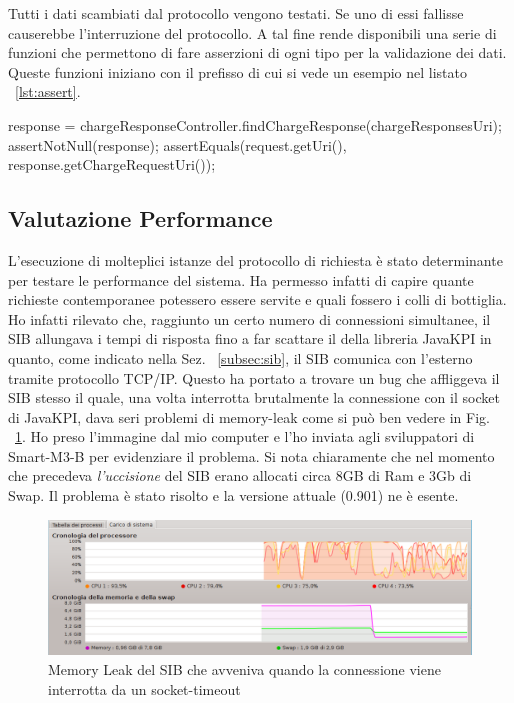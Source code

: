 Tutti i dati scambiati dal protocollo vengono testati. Se uno di essi fallisse causerebbe l'interruzione del protocollo. A tal fine  rende disponibili una serie di funzioni che permettono di fare asserzioni di ogni tipo per la validazione dei dati. Queste funzioni iniziano con il prefisso  di cui si vede un esempio nel listato ~\ref{lst:assert}.

\begin{java}[caption={Risposta ricavata a partire dall'uri, test del risultato},label={lst:assert}]
response = chargeResponseController.findChargeResponse(chargeResponsesUri);
assertNotNull(response);
assertEquals(request.getUri(), response.getChargeRequestUri());
\end{java}

\subsection{Valutazione Performance}

L'esecuzione di molteplici istanze del protocollo di richiesta è stato determinante per testare le performance del sistema. Ha permesso infatti di capire quante richieste contemporanee potessero essere servite e quali fossero i colli di bottiglia. Ho infatti rilevato che, raggiunto un certo numero di connessioni simultanee, il SIB allungava i tempi di risposta fino a far scattare il  della libreria JavaKPI in quanto, come indicato nella Sez. ~\ref{subsec:sib}, il SIB comunica con l'esterno tramite protocollo TCP/IP. Questo ha portato a trovare un bug che affliggeva il SIB stesso il quale, una volta interrotta brutalmente la connessione con il socket di JavaKPI, dava seri problemi di memory-leak come si può ben vedere in Fig. ~\ref{fig:sib-memory-leak}. Ho preso l'immagine dal mio computer e l'ho inviata agli sviluppatori di Smart-M3-B per evidenziare il problema. Si nota chiaramente che nel momento che precedeva \emph{l'uccisione} del SIB erano allocati circa 8GB di Ram e 3Gb di Swap. Il problema è stato risolto e la versione attuale (0.901) ne è esente.

\begin{figure}[H]
	\centering
	\includegraphics[width=1.0\textwidth]{assets/sib-memory-leak.png}
	\caption{Memory Leak del SIB che avveniva quando la connessione viene interrotta da un socket-timeout}
	\label{fig:sib-memory-leak}
\end{figure}

